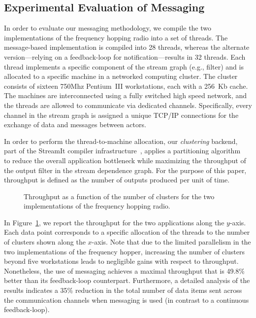 

\subsection{Experimental Evaluation of Messaging}

In order to evaluate our messaging methodology, we compile the two
implementations of the frequency hopping radio into a set of
threads. The message-based implementation is compiled into 28 threads,
whereas the alternate version---relying on a feedback-loop for
notification---results in 32 threads.  Each thread implements a
specific component of the stream graph (e.g., filter) and is allocated
to a specific machine in a networked computing cluster.  The cluster
consists of sixteen 750Mhz Pentium~III workstations, each with a
256~Kb cache.  The machines are interconnected using a fully switched
high speed network, and the threads are allowed to communicate via
dedicated channels. Specifically, every channel in the stream graph is
assigned a unique TCP/IP connections for the exchange of data and
messages between actors.

In order to perform the thread-to-machine allocation, our {\it
clustering} backend, part of the StreamIt
compiler infrastructure~\cite{streamit-asplos}, applies a partitioning
algorithm~\cite{thies-msp} to reduce the overall application
bottleneck while maximizing the throughput of the output filter in the
stream dependence graph. For the purpose of this paper, throughput is
defined as the number of outputs produced per unit of time.

\begin{figure}[t]
\caption{\small Throughput as a function of the number of clusters for
the two implementations of the frequency hopping radio.
\protect\label{fig:fhr-throughput}}
\end{figure}

In Figure~\ref{fig:fhr-throughput}, we report the throughput for the
two applications along the $y$-axis.  Each data point corresponds to a
specific allocation of the threads to the number of clusters shown
along the $x$-axis.  Note that due to the limited parallelism in the
two implementations of the frequency hopper, increasing the number of
clusters beyond five workstations leads to negligible gains with
respect to throughput.  Nonetheless, the use of messaging achieves a
maximal throughput that is 49.8\% better than its feedback-loop
counterpart. Furthermore, a detailed analysis of the results indicates
a 35\% reduction in the total number of data items sent across the
communication channels when messaging is used (in contrast to a
continuous feedback-loop).

